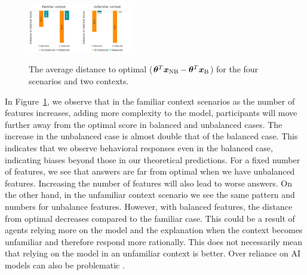 \begin{figure}[ht]
    \centering
    \includegraphics[width=0.2\textwidth]{Figures/distance_fam.png}
    \hspace{0.2in}
    \includegraphics[width=0.2\textwidth]{Figures/distance_unf.png}
    \caption{The average distance to optimal (${\bm{\theta}}^T{\bm{x}}_\text{NB}-{\bm{\theta}}^T{\bm{x}}_\text{B}$) for the four scenarios and two contexts.}
    \label{fig:dist-to-opt}
\end{figure}


In Figure~\ref{fig:dist-to-opt}, we observe that in the familiar context scenarios as the number of features increases, adding more complexity to the model, participants will move further away from the optimal score in balanced and unbalanced cases. The increase in the unbalanced case is almost double that of the balanced case. This indicates that we observe behavioral responses even in the balanced case, indicating biases beyond those in our theoretical predictions. For a fixed number of features, we see that answers are far from optimal when we have unbalanced features. Increasing the number of features will also lead to worse answers. On the other hand, in the unfamiliar context scenario we see the same pattern and numbers for unbalance features. However, with balanced features, the distance from optimal decreases compared to the familiar case. This could be a result of agents relying more on the model and the explanation when the context becomes unfamiliar and therefore respond more rationally. This does not necessarily mean that relying on the model in an unfamiliar context is better. Over reliance on AI models can also be problematic \cite{vasconcelos2023explanations, passi2022overreliance, buccinca2021trust}.

